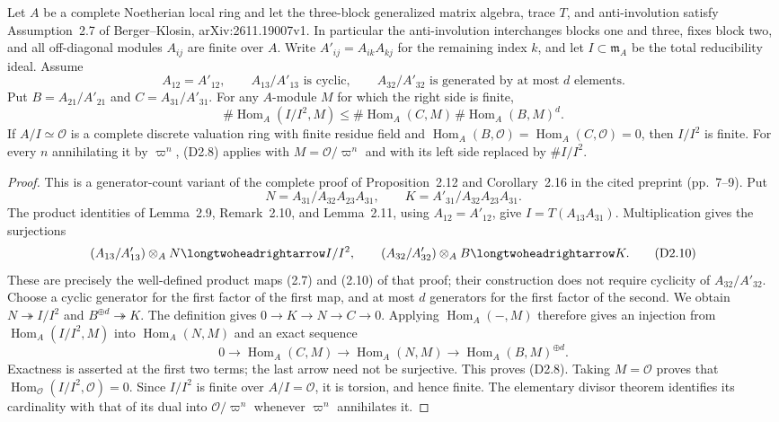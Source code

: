 \begin{lemma}
Let $A$ be a complete Noetherian local ring and let the
three-block generalized matrix algebra, trace $T$, and
anti-involution satisfy Assumption~2.7 of Berger--Klosin,
arXiv:2611.19007v1.  In particular the anti-involution
interchanges blocks one and three, fixes block two, and all
off-diagonal modules $A_{ij}$ are finite over $A$.
Write $A'_{ij}=A_{ik}A_{kj}$ for the remaining index $k$, and
let $I\subset\mathfrak m_A$ be the total reducibility ideal.
Assume
\[
 A_{12}=A'_{12},\qquad
 A_{13}/A'_{13}\text{ is cyclic},\qquad
 A_{32}/A'_{32}\text{ is generated by at most }d\text{ elements}.
                                                               \tag{D2.7}
\]
Put $B=A_{21}/A'_{21}$ and $C=A_{31}/A'_{31}$.
For any $A$-module $M$ for which the right side is finite,
\[
 \#\operatorname{Hom}_A(I/I^2,M)
 \leq\#\operatorname{Hom}_A(C,M)\,
       \#\operatorname{Hom}_A(B,M)^d.                         \tag{D2.8}
\]
If $A/I\simeq\mathcal O$ is a complete discrete valuation
ring with finite residue field and
$\operatorname{Hom}_A(B,\mathcal O)=
 \operatorname{Hom}_A(C,\mathcal O)=0$, then $I/I^2$ is finite.
For every $n$ annihilating it by $\varpi^n$, (D2.8) applies
with $M=\mathcal O/\varpi^n$ and with its left side replaced
by $\#I/I^2$.
\end{lemma}

\begin{proof}
This is a generator-count variant of the complete proof of
Proposition~2.12 and Corollary~2.16 in the cited preprint
(pp.~7--9).  Put
\[
 N=A_{31}/A_{32}A_{23}A_{31},\qquad
 K=A'_{31}/A_{32}A_{23}A_{31}.                                \tag{D2.9}
\]
The product identities of Lemma~2.9, Remark~2.10, and
Lemma~2.11, using
$A_{12}=A'_{12}$, give $I=T(A_{13}A_{31})$.
Multiplication gives the surjections
\[
 (A_{13}/A'_{13})\otimes_A N\longtwoheadrightarrow I/I^2,
 \qquad
 (A_{32}/A'_{32})\otimes_A B\longtwoheadrightarrow K.          \tag{D2.10}
\]
These are precisely the well-defined product maps (2.7) and
(2.10) of that proof; their construction does not require
cyclicity of $A_{32}/A'_{32}$.
Choose a cyclic generator for the first factor of the first
map, and at most $d$ generators for the first factor of the
second.  We obtain $N\twoheadrightarrow I/I^2$ and
$B^{\oplus d}\twoheadrightarrow K$.
The definition gives $0\to K\to N\to C\to0$.
Applying $\operatorname{Hom}_A(-,M)$ therefore gives an
injection from $\operatorname{Hom}_A(I/I^2,M)$ into
$\operatorname{Hom}_A(N,M)$ and an exact sequence
\[
 0\longrightarrow\operatorname{Hom}_A(C,M)
 \longrightarrow\operatorname{Hom}_A(N,M)
 \longrightarrow\operatorname{Hom}_A(B,M)^{\oplus d}.          \tag{D2.11}
\]
Exactness is asserted at the first two terms; the last arrow
need not be surjective.  This proves (D2.8).
Taking $M=\mathcal O$ proves that
$\operatorname{Hom}_{\mathcal O}(I/I^2,\mathcal O)=0$.
Since $I/I^2$ is finite over $A/I=\mathcal O$, it is torsion,
and hence finite.  The elementary divisor theorem identifies
its cardinality with that of its dual into
$\mathcal O/\varpi^n$ whenever $\varpi^n$ annihilates it.
\end{proof}

